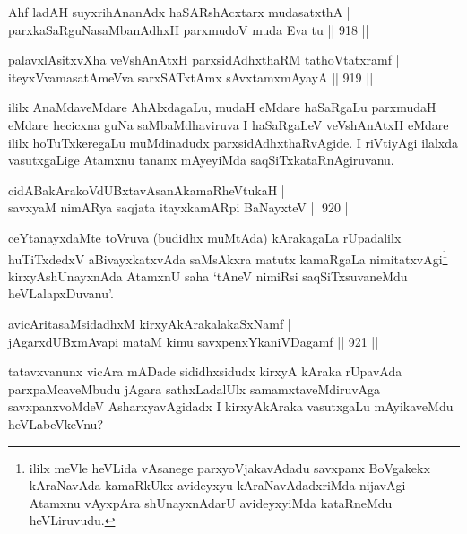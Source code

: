 
\begin{shl}
Ahf ladAH suyxrihA\s \s nanAdx haSARshAcxtarx mudasatxthA | \\
parxkaSaRguNasaMbanAdhxH parxmudoV muda Eva tu \hfill||  918 ||  
\end{shl}
				
\begin{shl}
palavxlAsitxvXha veVshAnAtxH parxsidAdhxthaRM tathoVtatxramf | \\
iteyxVvamasatAmeVva sarxSATx\s \s tAmx sAvxtamxmAyayA \hfill||  919 || 
\end{shl}

\begin{artha}
ililx AnaMdaveMdare AhAlxdagaLu, mudaH eMdare haSaRgaLu parxmudaH eMdare hecicxna guNa saMbaMdhaviruva I haSaRgaLeV veVshAnAtxH eMdare ililx hoTuTxkeregaLu muMdinadudx parxsidAdhxthaRvAgide. I riVtiyAgi ilalxda vasutxgaLige Atamxnu tananx mAyeyiMda saqSiTxkataRnAgiruvanu.
\end{artha}


\begin{shl}
cidABakArakoVdUBxtavAsanAkamaRheVtukaH | \\
savxyaM nimARya saqjata itayxkamARpi BaNayxteV \hfill||  920 ||  
\end{shl}

\begin{artha}
ceYtanayxdaMte toVruva (budidhx muMtAda) kArakagaLa rUpadalilx huTiTxdedxV aBivayxkatxvAda saMsAkxra matutx kamaRgaLa nimitatxvAgi\footnote{ililx meVle heVLida vAsanege parxyoVjakavAdadu savxpanx BoVgakekx kAraNavAda kamaRkUkx avideyxyu kAraNavAdadxriMda nijavAgi Atamxnu vAyxpAra shUnayxnAdarU avideyxyiMda kataRneMdu heVLiruvudu.} kirxyAshUnayxnAda AtamxnU saha `tAneV nimiRsi saqSiTxsuvaneMdu heVLalapxDuvanu'.
\end{artha}


\begin{shl}
avicAritasaMsidadhxM kirxyAkArakalakaSxNamf | \\
jAgarxdUBxmAvapi mataM kimu savxpenxYkaniVDagamf \hfill||  921 ||  
\end{shl}

\begin{artha}
tatavxvanunx vicAra mADade sididhxsidudx kirxyA kAraka rUpavAda parxpaMcaveMbudu jAgara sathxLadalUlx samamxtaveMdiruvAga savxpanxvoMdeV AsharxyavAgidadx I kirxyAkAraka vasutxgaLu mAyikaveMdu heVLabeVkeVnu?
\end{artha}

